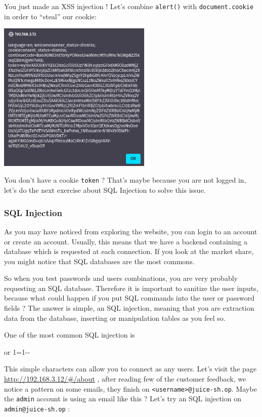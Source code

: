 \documentclass[a4paper,11pt,singlespacing]{article}
\newenvironment{Shaded}{}{}
\newcommand{\StringTok}[1]{\textcolor[rgb]{0.25,0.44,0.63}{#1}}
\begin{document}
You just made an XSS injection ! Let's combine \texttt{alert()} with
\texttt{document.cookie} in order to ``steal'' our cookie:

\includegraphics[width=0.55\textwidth,height=0.55\textheight]{Images/Image16.png}

You don't have a cookie \texttt{token} ? That's maybe because you are
not logged in, let's do the next exercise about SQL Injection to solve
this issue.

\subsubsection{SQL Injection}\label{sql-injection}

As you may have noticed from exploring the website, you can login to an
account or create an account. Usually, this means that we have a backend
containing a database which is requested at each connection. If you look
at the market share, you might notice that SQL databases are the most
commons.

So when you test passwords and users combinations, you are very probably
requesting an SQL database. Therefore it is important to sanitize the
user inputs, because what could happen if you put SQL commands into the
user or password fields ? The answer is simple, an SQL injection,
meaning that you are extraction data from the database, inserting or
manipulation tables as you feel so.

One of the most common SQL injection is

\begin{Shaded}
\begin{Highlighting}[]
\StringTok{\textquotesingle{} or 1=1{-}{-}}
\end{Highlighting}
\end{Shaded}

This simple characters can allow you to connect as any users. Let's
visit the page \url{http://192.168.3.12/\#/about} , after reading few of
the customer feedback, we notice a pattern on some emails, they finish
on \texttt{\textless{}username\textgreater{}@juice-sh.op}. Maybe the
\texttt{admin} account is using an email like this ? Let's try an SQL
injection on \texttt{admin@juice-sh.op} :
\end{document}
